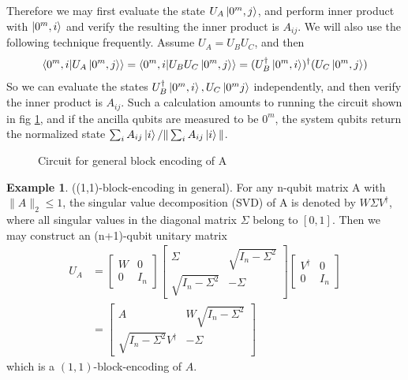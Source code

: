 \documentclass[12pt, oneside]{book}
\theoremstyle{definition}
\theoremstyle{definition}
\newtheorem{example}{Example}[section]
\theoremstyle{remark}
\begin{document}
Therefore we may first evaluate the state $U_A\ket{0^m,j}$, and perform inner product with $\ket{0^m,i}$ and verify the resulting the inner product is $A_{ij}$. We will also use the following technique frequently. Assume $U_A=U_BU_C$, and then
\[
\braket{0^m,i|U_A\ket{0^m,j}}=\braket{0^m,i|U_BU_C\ket{0^m,j}}=(U^{\dagger}_B\ket{0^m,i})^{\dagger}(U_C\ket{0^m,j})
\]
So we can evaluate the states $U^{\dagger}_B\ket{0^m,i},U_C\ket{0^mj}$ independently, and then verify the inner product is $A_{ij}$. Such a calculation amounts to running the circuit shown in fig \ref{fig:generalblockencoding}, and if the ancilla qubits are measured to be $0^m$, the system qubits return the normalized state $\sum_iA_{ij}\ket{i}/\|\sum_iA_{ij}\ket{i}\|$.
\begin{figure}[ht]
    \centering
    \caption{Circuit for general block encoding of A}
    \label{fig:generalblockencoding}
\end{figure}
\begin{example}
    ((1,1)-block-encoding in general). For any n-qubit matrix A with $\|A\|_2\leq 1$, the singular value decomposition (SVD) of A is denoted by $W\Sigma V^{\dagger}$, where all singular values in the diagonal matrix $\Sigma$ belong to $[0,1]$. Then we may construct an (n+1)-qubit unitary matrix
    \begin{align*}
    U_A&=\begin{bmatrix} W & 0 \\ 0 & I_n\end{bmatrix} \begin{bmatrix}\Sigma & \sqrt{I_n-\Sigma^2} \\ \sqrt{I_n-\Sigma^2} & -\Sigma \end{bmatrix} \begin{bmatrix} V^{\dagger} & 0 \\ 0 & I_n\end{bmatrix}\\
    &=\begin{bmatrix} A & W\sqrt{I_n-\Sigma^2} \\ \sqrt{I_n-\Sigma^2}V^{\dagger} & -\Sigma \end{bmatrix}
    \end{align*}
    which is a $(1,1)$-block-encoding of $A$.
\end{example}
\end{document}
